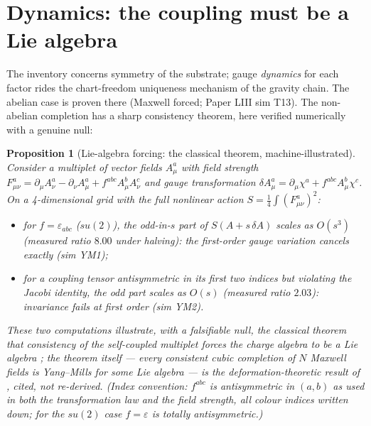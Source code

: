 \documentclass[12pt]{article}
\newtheorem{proposition}[theorem]{Proposition}
\theoremstyle{definition}
\theoremstyle{remark}
\begin{document}
\section{Dynamics: the coupling must be a Lie algebra}\label{sec:ym}

The inventory concerns symmetry of the substrate; gauge \emph{dynamics} for each factor rides the chart-freedom uniqueness mechanism of the gravity chain. The abelian case is proven there (Maxwell forced; Paper LIII sim T13). The non-abelian completion has a sharp consistency theorem, here verified numerically with a genuine null:

\begin{proposition}[Lie-algebra forcing: the classical theorem, machine-illustrated]\label{thm:lie}
Consider a multiplet of vector fields $A^a_\mu$ with field strength $F^a_{\mu\nu} = \partial_\mu A^a_\nu - \partial_\nu A^a_\mu + f^{abc}A^b_\mu A^c_\nu$ and gauge transformation $\delta A^a_\mu = \partial_\mu\chi^a + f^{abc}A^b_\mu\chi^c$. On a 4-dimensional grid with the full nonlinear action $S = \tfrac14\int (F^a_{\mu\nu})^2$:
\begin{itemize}
\item[(i)] for $f = \varepsilon_{abc}$ ($su(2)$), the odd-in-$s$ part of $S(A + s\,\delta A)$ scales as $O(s^3)$ (measured ratio $8.00$ under halving): the first-order gauge variation cancels exactly (sim YM1);
\item[(ii)] for a coupling tensor antisymmetric in its first two indices but violating the Jacobi identity, the odd part scales as $O(s)$ (measured ratio $2.03$): invariance fails at first order (sim YM2).
\end{itemize}
These two computations \emph{illustrate, with a falsifiable null}, the classical theorem that consistency of the self-coupled multiplet forces the charge algebra to be a Lie algebra \citep{GellMannGlashow1961, Deser1970}; the theorem itself --- every consistent cubic completion of $N$ Maxwell fields is Yang--Mills for some Lie algebra --- is the deformation-theoretic result of \citet{BarnichHenneaux1993}, cited, not re-derived. (Index convention: $f^{abc}$ is antisymmetric in $(a,b)$ as used in both the transformation law and the field strength, all colour indices written down; for the $su(2)$ case $f = \varepsilon$ is totally antisymmetric.)
\end{proposition}
\end{document}
